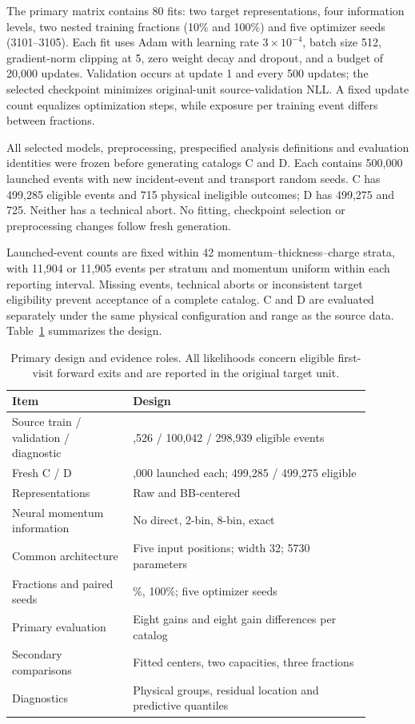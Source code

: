 \documentclass[11pt]{article}
\begin{document}
The primary matrix contains 80 fits: two target representations, four
information levels, two nested training fractions (10\% and 100\%) and
five optimizer seeds (3101--3105). Each fit uses Adam with learning rate
$3\times10^{-4}$, batch size 512, gradient-norm clipping at 5, zero weight
decay and dropout, and a budget of 20,000 updates. Validation occurs at update
1 and every 500 updates; the selected checkpoint minimizes original-unit
source-validation NLL. A fixed update count equalizes optimization steps,
while exposure per training event differs between fractions.

All selected models, preprocessing, prespecified analysis definitions and evaluation
identities were frozen before generating catalogs C and D. Each contains
500,000 launched events with new incident-event and transport random seeds.
C has 499,285 eligible events and 715 physical ineligible outcomes; D has
499,275 and 725. Neither has a technical abort. No fitting, checkpoint
selection or preprocessing changes follow fresh generation.

Launched-event counts are fixed within 42 momentum--thickness--charge strata,
with 11,904 or 11,905 events per stratum and momentum uniform within each
reporting interval. Missing events, technical aborts or inconsistent target
eligibility prevent acceptance of a complete catalog. C and D are evaluated
separately under the same physical configuration and range as the source data.
Table~\ref{tab:protocol} summarizes the design.

\begin{table}[t]
\centering
\caption{Primary design and evidence roles. All likelihoods concern eligible
first-visit forward exits and are reported in the original target unit.}
\label{tab:protocol}
\begin{tabular}{>{\raggedright\arraybackslash}p{0.30\linewidth}>{\raggedright\arraybackslash}p{0.59\linewidth}}
\toprule
Item & Design \\
\midrule
Source train / validation / diagnostic & 599,526 / 100,042 / 298,939 eligible events \\
Fresh C / D & 500,000 launched each; 499,285 / 499,275 eligible \\
Representations & Raw and BB-centered \\
Neural momentum information & No direct, 2-bin, 8-bin, exact \\
Common architecture & Five input positions; width 32; 5730 parameters \\
Fractions and paired seeds & 10\%, 100\%; five optimizer seeds \\
Primary evaluation & Eight gains and eight gain differences per catalog \\
Secondary comparisons & Fitted centers, two capacities, three fractions \\
Diagnostics & Physical groups, residual location and predictive quantiles \\
\bottomrule
\end{tabular}
\end{table}
\end{document}
